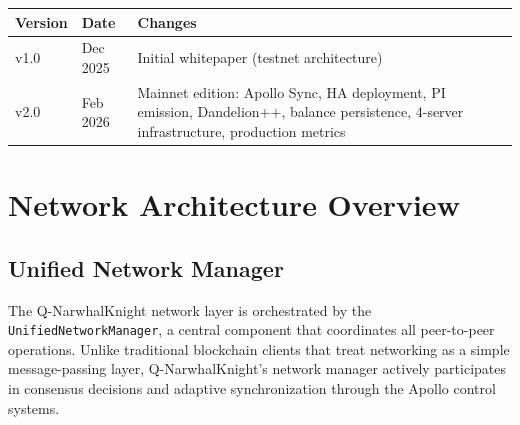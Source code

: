 \documentclass[11pt,a4paper]{article}
\begin{document}
\begin{table}[H]
\centering
\begin{tabular}{llp{8cm}}
\toprule
\textbf{Version} & \textbf{Date} & \textbf{Changes} \\
\midrule
v1.0 & Dec 2025 & Initial whitepaper (testnet architecture) \\
v2.0 & Feb 2026 & Mainnet edition: Apollo Sync, HA deployment, PI emission, Dandelion++, balance persistence, 4-server infrastructure, production metrics \\
\bottomrule
\end{tabular}
\end{table}

\section{Network Architecture Overview}

\subsection{Unified Network Manager}

The Q-NarwhalKnight network layer is orchestrated by the \texttt{UnifiedNetworkManager}, a central component that coordinates all peer-to-peer operations. Unlike traditional blockchain clients that treat networking as a simple message-passing layer, Q-NarwhalKnight's network manager actively participates in consensus decisions and adaptive synchronization through the Apollo control systems.
\end{document}

